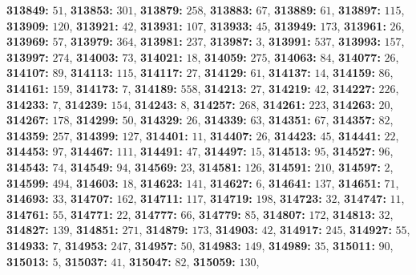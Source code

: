 \textsf{\bfseries 313849:} $51$, \textsf{\bfseries 313853:} $301$, \textsf{\bfseries 313879:} $258$, \textsf{\bfseries 313883:} $67$, \textsf{\bfseries 313889:} $61$, \textsf{\bfseries 313897:} $115$, \textsf{\bfseries 313909:} $120$, \textsf{\bfseries 313921:} $42$, \textsf{\bfseries 313931:} $107$, \textsf{\bfseries 313933:} $45$, \textsf{\bfseries 313949:} $173$, \textsf{\bfseries 313961:} $26$, \textsf{\bfseries 313969:} $57$, \textsf{\bfseries 313979:} $364$, \textsf{\bfseries 313981:} $237$, \textsf{\bfseries 313987:} $3$, \textsf{\bfseries 313991:} $537$, \textsf{\bfseries 313993:} $157$, \textsf{\bfseries 313997:} $274$, \textsf{\bfseries 314003:} $73$, \textsf{\bfseries 314021:} $18$, \textsf{\bfseries 314059:} $275$, \textsf{\bfseries 314063:} $84$, \textsf{\bfseries 314077:} $26$, \textsf{\bfseries 314107:} $89$, \textsf{\bfseries 314113:} $115$, \textsf{\bfseries 314117:} $27$, \textsf{\bfseries 314129:} $61$, \textsf{\bfseries 314137:} $14$, \textsf{\bfseries 314159:} $86$, \textsf{\bfseries 314161:} $159$, \textsf{\bfseries 314173:} $7$, \textsf{\bfseries 314189:} $558$, \textsf{\bfseries 314213:} $27$, \textsf{\bfseries 314219:} $42$, \textsf{\bfseries 314227:} $226$, \textsf{\bfseries 314233:} $7$, \textsf{\bfseries 314239:} $154$, \textsf{\bfseries 314243:} $8$, \textsf{\bfseries 314257:} $268$, \textsf{\bfseries 314261:} $223$, \textsf{\bfseries 314263:} $20$, \textsf{\bfseries 314267:} $178$, \textsf{\bfseries 314299:} $50$, \textsf{\bfseries 314329:} $26$, \textsf{\bfseries 314339:} $63$, \textsf{\bfseries 314351:} $67$, \textsf{\bfseries 314357:} $82$, \textsf{\bfseries 314359:} $257$, \textsf{\bfseries 314399:} $127$, \textsf{\bfseries 314401:} $11$, \textsf{\bfseries 314407:} $26$, \textsf{\bfseries 314423:} $45$, \textsf{\bfseries 314441:} $22$, \textsf{\bfseries 314453:} $97$, \textsf{\bfseries 314467:} $111$, \textsf{\bfseries 314491:} $47$, \textsf{\bfseries 314497:} $15$, \textsf{\bfseries 314513:} $95$, \textsf{\bfseries 314527:} $96$, \textsf{\bfseries 314543:} $74$, \textsf{\bfseries 314549:} $94$, \textsf{\bfseries 314569:} $23$, \textsf{\bfseries 314581:} $126$, \textsf{\bfseries 314591:} $210$, \textsf{\bfseries 314597:} $2$, \textsf{\bfseries 314599:} $494$, \textsf{\bfseries 314603:} $18$, \textsf{\bfseries 314623:} $141$, \textsf{\bfseries 314627:} $6$, \textsf{\bfseries 314641:} $137$, \textsf{\bfseries 314651:} $71$, \textsf{\bfseries 314693:} $33$, \textsf{\bfseries 314707:} $162$, \textsf{\bfseries 314711:} $117$, \textsf{\bfseries 314719:} $198$, \textsf{\bfseries 314723:} $32$, \textsf{\bfseries 314747:} $11$, \textsf{\bfseries 314761:} $55$, \textsf{\bfseries 314771:} $22$, \textsf{\bfseries 314777:} $66$, \textsf{\bfseries 314779:} $85$, \textsf{\bfseries 314807:} $172$, \textsf{\bfseries 314813:} $32$, \textsf{\bfseries 314827:} $139$, \textsf{\bfseries 314851:} $271$, \textsf{\bfseries 314879:} $173$, \textsf{\bfseries 314903:} $42$, \textsf{\bfseries 314917:} $245$, \textsf{\bfseries 314927:} $55$, \textsf{\bfseries 314933:} $7$, \textsf{\bfseries 314953:} $247$, \textsf{\bfseries 314957:} $50$, \textsf{\bfseries 314983:} $149$, \textsf{\bfseries 314989:} $35$, \textsf{\bfseries 315011:} $90$, \textsf{\bfseries 315013:} $5$, \textsf{\bfseries 315037:} $41$, \textsf{\bfseries 315047:} $82$, \textsf{\bfseries 315059:} $130$, 
